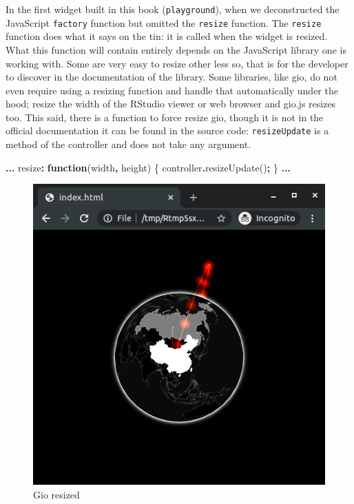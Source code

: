 \documentclass[
]{krantz}
\makeatletter
\newenvironment{Shaded}{\begin{snugshade}}{\end{snugshade}}
\newcommand{\FunctionTok}[1]{\textcolor[rgb]{0,0,0}{#1}}
\newcommand{\KeywordTok}[1]{\textcolor[rgb]{0.27,0.27,0.27}{\textbf{#1}}}
\newcommand{\NormalTok}[1]{#1}
\newcommand{\OperatorTok}[1]{\textcolor[rgb]{0.43,0.43,0.43}{\textbf{#1}}}
\newenvironment{kframe}{%
\medskip{}
\setlength{\fboxsep}{.8em}
 \def\at@end@of@kframe{}%
 \ifinner\ifhmode%
  \def\at@end@of@kframe{\end{minipage}}%
  \begin{minipage}{\columnwidth}%
 \fi\fi%
 \def\FrameCommand##1{\hskip\@totalleftmargin \hskip-\fboxsep
 \colorbox{shadecolor}{##1}\hskip-\fboxsep
     \hskip-\linewidth \hskip-\@totalleftmargin \hskip\columnwidth}%
 \MakeFramed {\advance\hsize-\width
   \@totalleftmargin\z@ \linewidth\hsize
   \@setminipage}}%
 {\par\unskip\endMakeFramed%
 \at@end@of@kframe}
\renewenvironment{Shaded}{\begin{kframe}}{\end{kframe}}
\makeatother
\begin{document}
In the first widget built in this book (\texttt{playground}), when we deconstructed the JavaScript \texttt{factory} function but omitted the \texttt{resize} function. The \texttt{resize} function does what it says on the tin: it is called when the widget is resized. What this function will contain entirely depends on the JavaScript library one is working with. Some are very easy to resize other less so, that is for the developer to discover in the documentation of the library. Some libraries, like gio, do not even require using a resizing function and handle that automatically under the hood; resize the width of the RStudio viewer or web browser and gio.js resizes too. This said, there is a function to force resize gio, though it is not in the official documentation it can be found in the source code: \texttt{resizeUpdate} is a method of the controller and does not take any argument.

\begin{Shaded}
\begin{Highlighting}[]
\OperatorTok{...}
\NormalTok{resize}\OperatorTok{:} \KeywordTok{function}\NormalTok{(width}\OperatorTok{,}\NormalTok{ height) \{}
\NormalTok{  controller}\OperatorTok{.}\FunctionTok{resizeUpdate}\NormalTok{()}\OperatorTok{;}
\NormalTok{\}}
\OperatorTok{...}
\end{Highlighting}
\end{Shaded}

\begin{figure}
\centering
\includegraphics{images/gio-small.png}
\caption{Gio resized}
\end{figure}
\end{document}
